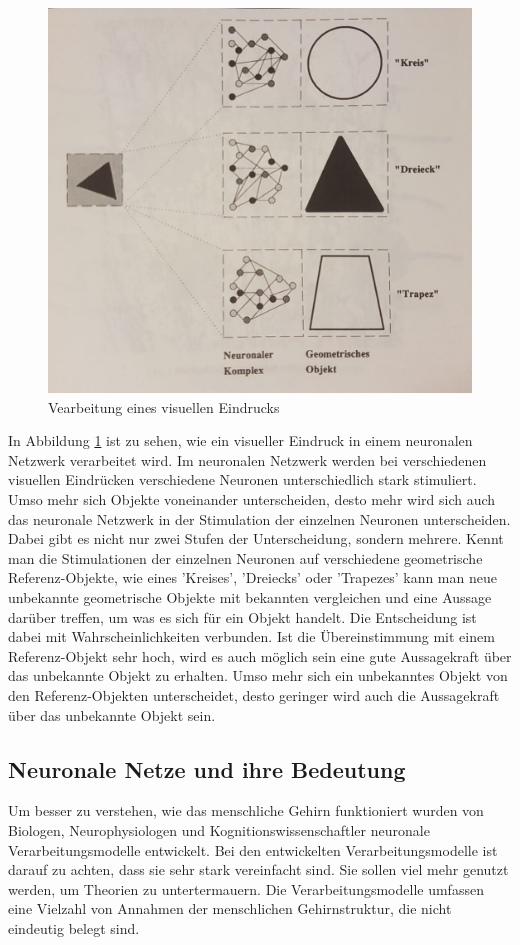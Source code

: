 \begin{figure}[hbt]
	\centering
	\includegraphics[width=0.9\linewidth]{./Bilder/VerarbeitungVisuellerEindruck-Kratzer}
	\caption{Vearbeitung eines visuellen Eindrucks \cite[S. 9]{Kratzer1991}}
	\label{fig:visuelleVerarbeitung}
\end{figure}

In Abbildung \ref{fig:visuelleVerarbeitung} ist zu sehen, wie ein visueller Eindruck in einem neuronalen Netzwerk verarbeitet wird. Im neuronalen Netzwerk werden bei verschiedenen visuellen Eindrücken verschiedene Neuronen unterschiedlich stark stimuliert. Umso mehr sich Objekte voneinander unterscheiden, desto mehr wird sich auch das neuronale Netzwerk in der Stimulation der einzelnen Neuronen unterscheiden. Dabei gibt es nicht nur zwei Stufen der Unterscheidung, sondern mehrere. Kennt man die Stimulationen der einzelnen Neuronen auf verschiedene geometrische Referenz-Objekte, wie eines 'Kreises', 'Dreiecks' oder 'Trapezes' kann man neue unbekannte geometrische Objekte mit bekannten vergleichen und eine Aussage darüber treffen, um was es sich für ein Objekt handelt. Die Entscheidung ist dabei mit Wahrscheinlichkeiten verbunden. Ist die Übereinstimmung mit einem Referenz-Objekt sehr hoch, wird es auch möglich sein eine gute Aussagekraft über das unbekannte Objekt zu erhalten. Umso mehr sich ein unbekanntes Objekt von den Referenz-Objekten unterscheidet, desto geringer wird auch die Aussagekraft über das unbekannte Objekt sein.

\subsection{Neuronale Netze und ihre Bedeutung \cite{Kratzer1991}}
Um besser zu verstehen, wie das menschliche Gehirn funktioniert wurden von Biologen, Neurophysiologen und Kognitionswissenschaftler neuronale Verarbeitungsmodelle entwickelt. Bei den entwickelten Verarbeitungsmodelle ist darauf zu achten, dass sie sehr stark vereinfacht sind. Sie sollen viel mehr genutzt werden, um Theorien zu untertermauern. Die Verarbeitungsmodelle umfassen eine Vielzahl von Annahmen der menschlichen Gehirnstruktur, die nicht eindeutig belegt sind.

